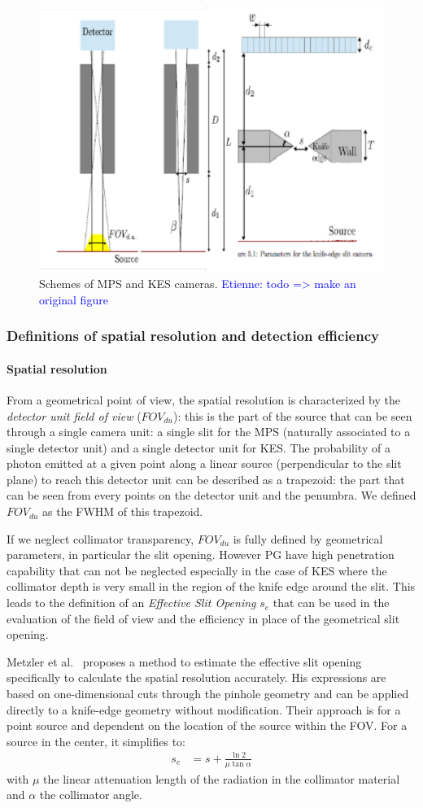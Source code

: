 \documentclass[a4paper,english]{article}
\newcommand{\tcb}[1]{\textcolor{blue}{#1}}
\begin{document}
\begin{figure}[htp]
    \centering
    \includegraphics[width=.45\textwidth]{SchemeMPS-KES}
    \caption{\label{GeomSchemes}Schemes of MPS and KES cameras. \tcb{Etienne: todo => make an original figure}}
\end{figure}          

\subsubsection{Definitions of spatial resolution and detection efficiency}

\paragraph{Spatial resolution}
From a geometrical point of view, the spatial resolution is characterized by the \textit{detector unit field of view} ($FOV_{du}$): this is the part of the source that can be seen through a single camera unit: a single slit for the MPS (naturally associated to a single detector unit) and a single detector unit for KES. The probability of a photon emitted at a given point along a linear source (perpendicular to the slit plane) to reach this detector unit can be described as a trapezoid: the part that can be seen from every points on the detector unit and the penumbra. We defined $FOV_{du}$ as the FWHM of this trapezoid.

If we neglect collimator transparency, $FOV_{du}$ is fully defined by geometrical parameters, in particular the slit opening. However PG have high penetration capability that can not be neglected especially in the case of KES where the collimator depth is very small in the region of the knife edge around the slit. This leads to the definition of an \textit{Effective Slit Opening} $s_e$ that can be used in the evaluation of the field of view and the efficiency in place of the geometrical slit opening. 

Metzler et al.~\cite{Metzler2005} proposes a method to estimate the effective slit opening specifically to calculate the spatial resolution accurately. His expressions are based on one-dimensional cuts through the pinhole geometry and can be applied directly to a knife-edge geometry without modification. Their approach is for a point source and dependent on the location of the source within the FOV. For a source in the center, it simplifies to:
\begin{align}
  s_e &= s + \frac{\ln2}{\mu\tan\alpha} 
\end{align}
with $\mu$ the linear attenuation length of the radiation in the collimator material and $\alpha$ the collimator angle.
\end{document}
